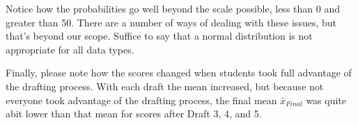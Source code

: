 \documentclass{article}\usepackage[]{graphicx}\usepackage[]{color}
\begin{document}
Notice how the probabilities go well beyond the scale possible, less than 0 and greater than 50. There are a number of ways of dealing with these issues, but that's beyond our scope. Suffice to say that a normal distribution is not appropriate for all data types. 

Finally, please note how the scores changed when students took full advantage of the drafting process. With each draft the mean increased, but because not everyone took advantage of the drafting process, the final mean $\bar{x}_{Final}$ was quite abit lower than that mean for scores after Draft 3, 4, and 5. 
\end{document}
